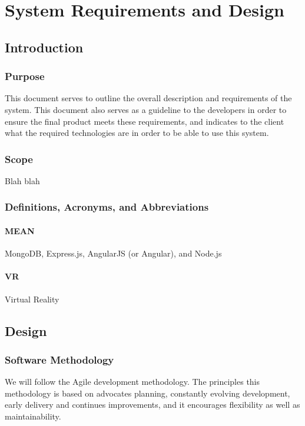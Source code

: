 
\section{System Requirements and Design}

\subsection{Introduction}

	\subsubsection{Purpose}
	This document serves to outline the overall description and requirements of 	the system. This document also serves as a guideline to the developers in 		order to ensure the final product meets these requirements, and indicates 		to the client what the required technologies are in order to be able to use 	this system.

	\subsubsection{Scope}

	Blah blah

	\subsubsection{Definitions, Acronyms, and Abbreviations}
			\paragraph{MEAN}	MongoDB, Express.js, AngularJS (or Angular), and Node.js
			\paragraph{VR}	Virtual Reality

\subsection{Design}

	\subsubsection{Software Methodology}
	We will follow the Agile development methodology. The principles this methodology is based on advocates planning, constantly evolving development, early delivery and continues improvements, and it encourages flexibility as well as maintainability.

